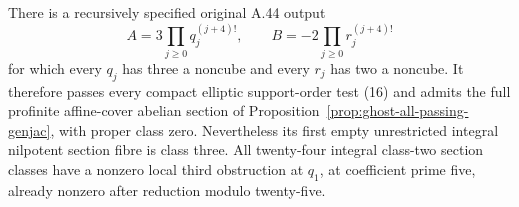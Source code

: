 \begin{theorem}
\label{thm:ghost-passing-first-class3}
There is a recursively specified original A.44 output
\[
 A=3\prod_{j\ge0}q_j^{(j+4)!},\qquad
 B=-2\prod_{j\ge0}r_j^{(j+4)!}
                                                        \tag{55}
\]
for which every \(q_j\) has three a noncube and
every \(r_j\) has two a noncube. It therefore
passes every compact elliptic support-order test
(16) and admits the full profinite affine-cover
abelian section of
Proposition~\ref{prop:ghost-all-passing-genjac},
with proper class zero. Nevertheless its first
empty unrestricted integral nilpotent section fibre
is class three. All twenty-four integral class-two
section classes have a nonzero local third
obstruction at \(q_1\), at coefficient prime five,
already nonzero after reduction modulo twenty-five.
\end{theorem}
